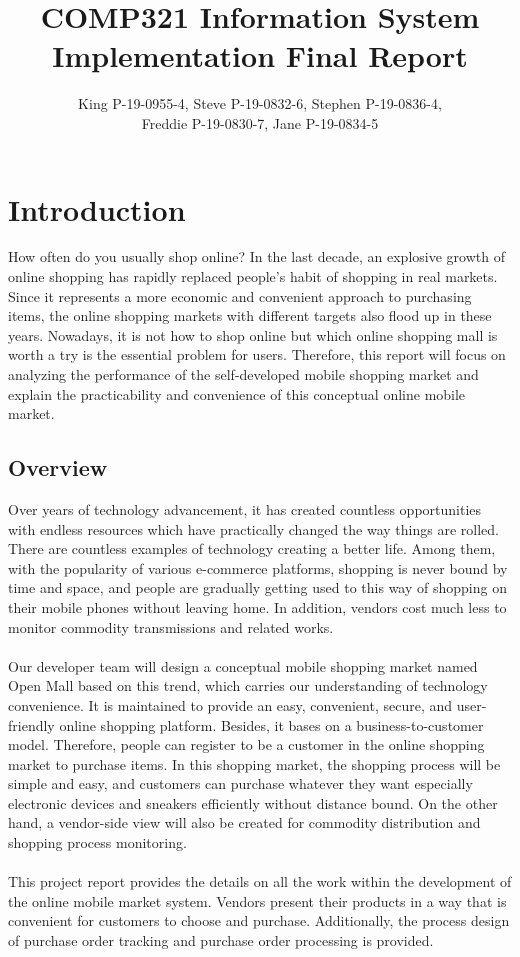 \documentclass{article}
\title{COMP321 Information System Implementation 
Final Report}
\author{King P-19-0955-4,
Steve P-19-0832-6,
Stephen P-19-0836-4,\\
Freddie P-19-0830-7,
Jane P-19-0834-5}
\begin{document}
\maketitle


\section{Introduction}

How often do you usually shop online? In the last decade, an explosive growth of online shopping has rapidly replaced people’s habit of shopping in real markets. Since it represents a more economic and convenient approach to purchasing items, the online shopping markets with different targets also flood up in these years\cite{1.1}. Nowadays, it is not how to shop online but which online shopping mall is worth a try is the essential problem for users. Therefore, this report will focus on analyzing the performance of the self-developed mobile shopping market and explain the practicability and convenience of this conceptual online mobile market.
\subsection{Overview}

Over years of technology advancement, it has created countless opportunities with endless resources which have practically changed the way things are rolled. There are countless examples of technology creating a better life. Among them, with the popularity of various e-commerce platforms, shopping is never bound by time and space, and people are gradually getting used to this way of shopping on their mobile phones without leaving home. In addition, vendors cost much less to monitor commodity transmissions and related works. 
\\\\
Our developer team will design a conceptual mobile shopping market named Open Mall based on this trend, which carries our understanding of technology convenience. It is maintained to provide an easy, convenient, secure, and user-friendly online shopping platform. Besides, it bases on a business-to-customer model. Therefore, people can register to be a customer in the online shopping market to purchase items\cite{1.2}. 
In this shopping market, the shopping process will be simple and easy, and customers can purchase whatever they want especially electronic devices and sneakers efficiently without distance bound. On the other hand, a vendor-side view will also be created for commodity distribution and shopping process monitoring.
\\\\
This project report provides the details on all the work within the development of the online mobile market system. Vendors present their products in a way that is convenient for customers to choose and purchase. Additionally, the process design of purchase order tracking and purchase order processing is provided.
\end{document}
